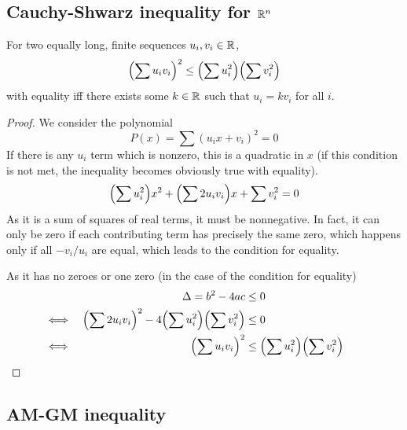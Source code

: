 \subsection[Cauchy-Shwarz inequality for \(\Reals^n\)]
           {Cauchy-Shwarz inequality for \boldmath\(\Reals^n\)}

\begin{theorem}
For two equally long, finite sequences \(u_i, v_i \in \mathbb R\),
\begin{equation*}
\pqty{\sum u_i v_i}^2 \le \pqty{\sum u_i^2} \pqty{\sum v_i^2}
\end{equation*}
with equality iff there exists some \(k \in \mathbb R\) such that
\(u_i = k v_i\) for all \(i\).
\end{theorem}
\begin{proof}
We consider the polynomial
\begin{equation*}
P(x) = \sum (u_i x + v_i)^2 = 0
\end{equation*}
If there is any \(u_i\) term which is nonzero, this is a quadratic in \(x\)
(if this condition is not met, the inequality becomes obviously true with
equality).
\begin{equation*}
\pqty{\sum u_i^2} x^2 + \pqty{\sum 2 u_i v_i} x + \sum v_i^2 = 0
\end{equation*}
As it is a sum of squares of real terms, it must be nonnegative. In fact, it
can only be zero if each contributing term has precisely the same zero,
which happens only if all \(-v_i/u_i\) are equal, which leads to the
condition for equality.

As it has no zeroes or one zero (in the case of the condition for equality)
\begin{alignat*}{2}
&&\Delta = b^2 - 4ac &\le 0 \\
&\iff&
\pqty{\sum 2 u_i v_i}^2 - 4\pqty{\sum u_i^2}\pqty{\sum v_i^2} &\le 0 \\
&\iff& \pqty{\sum u_i v_i}^2 &\le \pqty{\sum u_i^2} \pqty{\sum v_i^2}
    \tag*{\qedhere}
\end{alignat*}
\end{proof}

\subsection{AM-GM inequality}

